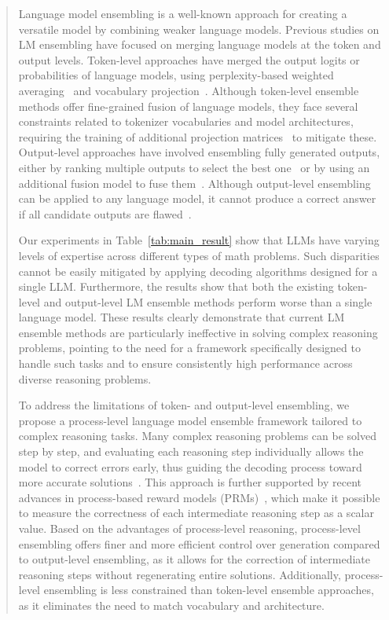 \documentclass[11pt]{article}
\begin{document}
\begin{abstract}
Language model ensembling is a well-known approach for creating a versatile model by combining weaker language models. 
Previous studies on LM ensembling have focused on merging language models at the token and output levels.
Token-level approaches have merged the output logits or probabilities of language models, using perplexity-based weighted averaging~\citep{liu-etal-2024-coolfusion, mavromatis-etal-2024-packllm} and vocabulary projection~\citep{xu-etal-2024-bridging}.
Although token-level ensemble methods offer fine-grained fusion of language models, they face several constraints related to tokenizer vocabularies and model architectures, requiring the training of additional projection matrices~\citep{xu-etal-2024-bridging} to mitigate these.
Output-level approaches have involved ensembling fully generated outputs, either by ranking multiple outputs to select the best one~\citep{farinhas-etal-2023-empirical, jiang-etal-2023-llm} or by using an additional fusion model to fuse them~\citep{jiang-etal-2023-llm}.
Although output-level ensembling can be applied to any language model, it cannot produce a correct answer if all candidate outputs are flawed~\citep{xu-etal-2024-bridging}.

Our experiments in Table~\ref{tab:main_result} show that LLMs have varying levels of expertise across different types of math problems. 
Such disparities cannot be easily mitigated by applying decoding algorithms designed for a single LLM.
Furthermore, the results show that both the existing token-level and output-level LM ensemble methods perform worse than a single language model. 
These results clearly demonstrate that current LM ensemble methods are particularly ineffective in solving complex reasoning problems, pointing to the need for a framework specifically designed to handle such tasks and to ensure consistently high performance across diverse reasoning problems.

To address the limitations of token- and output-level ensembling, we propose a process-level language model ensemble framework tailored to complex reasoning tasks. 
Many complex reasoning problems can be solved step by step, and evaluating each reasoning step individually allows the model to correct errors early, thus guiding the decoding process toward more accurate solutions~\cite{yao-etal-2024-tree, besta-etal-2024-graph, yu-etal-2024-ovm, ma-etal-2023-let}. 
This approach is further supported by recent advances in process-based reward models (PRMs)~\citep{lightman-etal-2023-prm800k, wang-etal-2024-math, lu-etal-2024-autocv}, which make it possible to measure the correctness of each intermediate reasoning step as a scalar value.
Based on the advantages of process-level reasoning, process-level ensembling offers finer and more efficient control over generation compared to output-level ensembling, as it allows for the correction of intermediate reasoning steps without regenerating entire solutions. 
Additionally, process-level ensembling is less constrained than token-level ensemble approaches, as it eliminates the need to match vocabulary and architecture.


\end{abstract}
\end{document}
